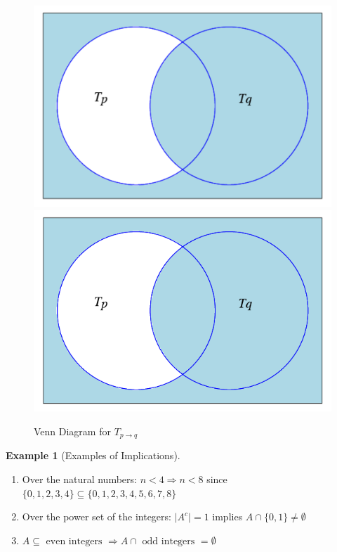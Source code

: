\documentclass[10pt,]{book}
\theoremstyle{plain}
\theoremstyle{definition}
\theoremstyle{definition}
\theoremstyle{definition}
\newtheorem{example}[theorem]{Example}
\theoremstyle{definition}
\begin{document}
\begin{figure}
\centering
{}%
{\includegraphics[width=1\linewidth]{images/sageplot-venn-truth-set-conditional.pdf}}%
{\includegraphics[width=1\linewidth]{images/sageplot-venn-truth-set-conditional.png}}
\caption{Venn Diagram for \(T_{p\to q}\) \label{venn_diagram_truth_set_conditional}}
\end{figure}
\begin{example}[Examples of Implications]\label{ex-implications-over-U}
\leavevmode%
\begin{enumerate}[label=\alph*]
\item\hypertarget{li-237}{} Over the natural numbers: \(n < 4 \Rightarrow  n < 8\) since \(\{0, 1, 2, 3, 4\} \subseteq  \{0, 1, 2, 3, 4, 5, 6, 7, 8\}\)%
\item\hypertarget{li-238}{}  Over the power set of the integers: \(\lvert A^c \rvert=1\) implies \(A\cap \{0,1\}\neq \emptyset\)%
\item\hypertarget{li-239}{} \(A \subseteq  \textrm{ even integers } \Rightarrow  A\cap  \textrm{ odd integers } =\emptyset\)%
\end{enumerate}
%
\end{example}
\typeout{************************************************}
\typeout{************************************************}
\end{document}
